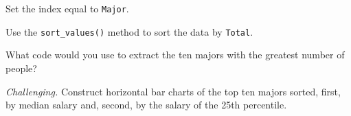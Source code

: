 \documentclass[11pt]{exam}
\begin{document}
\begin{questions}
\begin{parts}
\item Set the index equal to {\tt Major}.

\item Use the \verb|sort_values()| method to sort the data by {\tt Total}.

\item What code would you use to extract the ten majors with the greatest number of people?

\item {\it Challenging.\/}
Construct horizontal bar charts of the top ten majors sorted, first, by median salary
and, second, by the salary of the 25th percentile.
\end{parts}

\end{questions}
\end{document}
